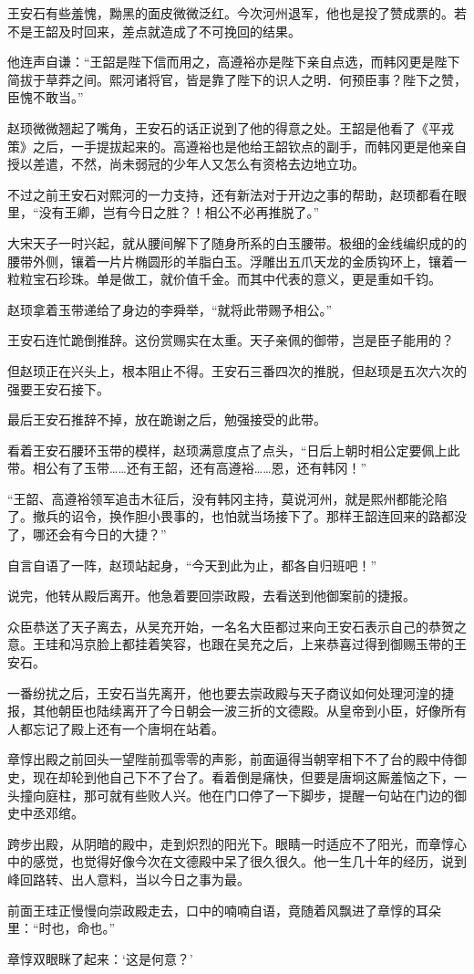 王安石有些羞愧，黝黑的面皮微微泛红。今次河州退军，他也是投了赞成票的。若不是王韶及时回来，差点就造成了不可挽回的结果。

他连声自谦：“王韶是陛下信而用之，高遵裕亦是陛下亲自点选，而韩冈更是陛下简拔于草莽之间。熙河诸将官，皆是靠了陛下的识人之明．何预臣事？陛下之赞，臣愧不敢当。”

赵顼微微翘起了嘴角，王安石的话正说到了他的得意之处。王韶是他看了《平戎策》之后，一手提拔起来的。高遵裕也是他给王韶钦点的副手，而韩冈更是他亲自授以差遣，不然，尚未弱冠的少年人又怎么有资格去边地立功。

不过之前王安石对熙河的一力支持，还有新法对于开边之事的帮助，赵顼都看在眼里，“没有王卿，岂有今日之胜？！相公不必再推脱了。”

大宋天子一时兴起，就从腰间解下了随身所系的白玉腰带。极细的金线编织成的的腰带外侧，镶着一片片椭圆形的羊脂白玉。浮雕出五爪天龙的金质钩环上，镶着一粒粒宝石珍珠。单是做工，就价值千金。而其中代表的意义，更是重如千钧。

赵顼拿着玉带递给了身边的李舜举，“就将此带赐予相公。”

王安石连忙跪倒推辞。这份赏赐实在太重。天子亲佩的御带，岂是臣子能用的？

但赵顼正在兴头上，根本阻止不得。王安石三番四次的推脱，但赵顼是五次六次的强要王安石接下。

最后王安石推辞不掉，放在跪谢之后，勉强接受的此带。

看着王安石腰环玉带的模样，赵顼满意度点了点头，“日后上朝时相公定要佩上此带。相公有了玉带……还有王韶，还有高遵裕……恩，还有韩冈！”

“王韶、高遵裕领军追击木征后，没有韩冈主持，莫说河州，就是熙州都能沦陷了。撤兵的诏令，换作胆小畏事的，也怕就当场接下了。那样王韶连回来的路都没了，哪还会有今日的大捷？”

自言自语了一阵，赵顼站起身，“今天到此为止，都各自归班吧！”

说完，他转从殿后离开。他急着要回崇政殿，去看送到他御案前的捷报。

众臣恭送了天子离去，从吴充开始，一名名大臣都过来向王安石表示自己的恭贺之意。王珪和冯京脸上都挂着笑容，也跟在吴充之后，上来恭喜过得到御赐玉带的王安石。

一番纷扰之后，王安石当先离开，他也要去崇政殿与天子商议如何处理河湟的捷报，其他朝臣也陆续离开了今日朝会一波三折的文德殿。从皇帝到小臣，好像所有人都忘记了殿上还有一个唐坰在站着。

章惇出殿之前回头一望陛前孤零零的声影，前面逼得当朝宰相下不了台的殿中侍御史，现在却轮到他自己下不了台了。看着倒是痛快，但要是唐坰这厮羞恼之下，一头撞向庭柱，那可就有些败人兴。他在门口停了一下脚步，提醒一句站在门边的御史中丞邓绾。

跨步出殿，从阴暗的殿中，走到炽烈的阳光下。眼睛一时适应不了阳光，而章惇心中的感觉，也觉得好像今次在文德殿中呆了很久很久。他一生几十年的经历，说到峰回路转、出人意料，当以今日之事为最。

前面王珪正慢慢向崇政殿走去，口中的喃喃自语，竟随着风飘进了章惇的耳朵里：“时也，命也。”

章惇双眼眯了起来：‘这是何意？’

